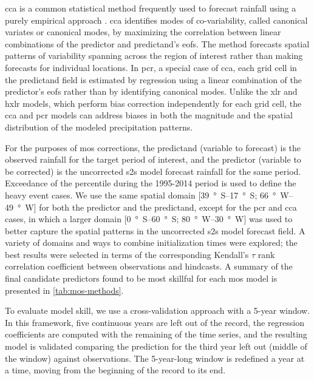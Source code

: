 \documentclass{ametsoc}
\begin{document}
\Gls{cca} is a common statistical method frequently used to forecast rainfall using a purely empirical approach \citep{Mason2008,Barnston2012,Jolliffe2012,Barnston1992,Wilks2006}.
\Gls{cca} identifies modes of co-variability, called canonical variates or canonical modes, by maximizing the correlation between linear combinations of the predictor and predictand's \glspl{eof}.
The method forecasts spatial patterns of variability spanning across the region of interest rather than making forecasts for individual locations.
In \gls{pcr}, a special case of \gls{cca}, each grid cell in the predictand field is estimated by regression using a linear combination of the predictor's \glspl{eof} \citep{Mason2008,Wilks2006} rather than by identifying canonical modes.
Unlike the \gls{xlr} and \gls{hxlr} models, which perform bias correction independently for each grid cell, the \gls{cca} and \gls{pcr} models can address biases in both the magnitude and the spatial distribution of the modeled precipitation patterns.

For the purposes of \gls{mos} corrections, the predictand (variable to forecast) is the observed rainfall for the target period of interest, and the predictor (variable to be corrected) is the uncorrected \gls{s2s} model forecast rainfall for the same period.
Exceedance of the  percentile during the 1995-2014 period is used to define the heavy event cases.
We use the same spatial domain [\SIrange{39}{17}{\degree S}; \SIrange{66}{49}{\degree W}] for both the predictor and the predictand, except for the \gls{pcr} and \gls{cca} cases, in which a larger domain [\SIrange{0}{60}{\degree S}; \SIrange{80}{30}{\degree W}] was used to better capture the spatial patterns in the uncorrected \gls{s2s} model forecast field.
A variety of domains and ways to combine initialization times were explored; the best results were selected in terms of the corresponding Kendall's $\tau$ rank correlation coefficient between observations and hindcasts.
A summary of the final candidate predictors found to be most skillful for each \gls{mos} model is presented in \cref{tab:mos-methods}.

To evaluate model skill, we use a cross-validation approach with a 5-year window.
In this framework, five continuous years are left out of the record, the regression coefficients are computed with the remaining of the time series, and the resulting model is validated comparing the prediction for the third year left out (middle of the window) against observations.
The 5-year-long window is redefined a year at a time, moving from the beginning of the record to its end.
\end{document}
